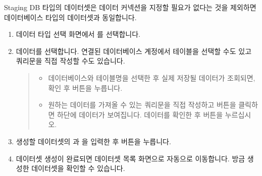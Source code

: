 \documentclass[letterpaper,10pt,english]{sphinxmanual}
\begin{document}
Staging DB 타입의 데이터셋은 데이터 커넥션을 지정할 필요가 없다는 것을 제외하면 데이터베이스 타입의 데이터셋과 동일합니다.
\begin{enumerate}
\def\theenumi{\arabic{enumi}}
\def\labelenumi{\theenumi .}
\makeatletter\def\p@enumii{\p@enumi \theenumi .}\makeatother
\item {} 
데이터 타입 선택 화면에서 를 선택합니다.

\item {} 
데이터를 선택합니다. 연결된 데이터베이스 계정에서 테이블을 선택할 수도 있고 쿼리문을 직접 작성할 수도 있습니다.
\begin{quote}

\begin{figure}[H]
\centering

\noindent{}
\end{figure}
\begin{itemize}
\item {} 
 데이터베이스와 테이블명을 선택한 후 실제 저장될 데이터가 조회되면, 확인 후  버튼을 누릅니다.

\item {} 
 원하는 데이터를 가져올 수 있는 쿼리문을 직접 작성하고  버튼을 클릭하면 하단에 데이터가 보여집니다. 데이터를 확인한 후  버튼을 누르십시오.

\end{itemize}
\end{quote}

\item {} 
생성할 데이터셋의 과 을 입력한 후  버튼을 누릅니다.
\begin{quote}

\begin{figure}[H]
\centering

\noindent{}
\end{figure}
\end{quote}

\item {} 
데이터셋 생성이 완료되면 데이터셋 목록 화면으로 자동으로 이동합니다. 방금 생성한 데이터셋을 확인할 수 있습니다.
\begin{quote}

\begin{figure}[H]
\centering

\noindent{}
\end{figure}
\end{quote}

\end{enumerate}
\end{document}
